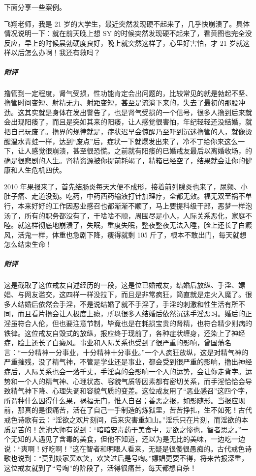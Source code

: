 下面分享一些案例。

\begin{case}
    飞翔老师，我是 21 岁的大学生，最近突然发现硬不起来了，几乎快崩溃了。具体情况说明一下：就在前天晚上想 SY 的时候突然发现硬不起来了，看黄图也完全没反应，早上的时候晨勃硬度良好，晚上就突然这样了，心里好害怕，才 21 岁就这样以后怎么办啊！我还有救吗？
    \subparagraph{附评} 撸管到一定程度，肾气受损，性功能肯定会出问题的，比较常见的就是勃起不坚、撸管时间变短、射精无力、射距变短，甚至是流淌下来的，失去了最初的那股冲劲。这其实就是身体在发出警告了，也是肾气受损的一个信号，很多人撸到后来就会出现阳痿了，而且是突如其来的阳痿，让人感觉很害怕，年纪轻轻还没结婚，就把自己玩废了。撸界的规律就是，症状迟早会惊醒乃至吓到沉迷撸管的人，就像烫醒温水青蛙一样，达到“废点”后，症状一下就爆发出来了，冷不丁给你来这么一下，让人感觉很崩溃，甚至很恐慌。之前就有阳痿的已婚戒友最后以离婚收场，的确是很悲剧的人生。肾精资源被你提前耗竭了，精箱已经空了，结果就会让你的健康和人生危机四伏。
\end{case}

\begin{case}
    2010 年果报来了，首先结肠炎每天大便不成形，接着前列腺炎也来了，尿频、小肚子痛、走道没劲。吃药，中药西药输液打针加理疗，全都无效。福无双至祸不单行，本来好好的工作因恶业感召也都渐渐不顺了，马上要提科级干部，恶梦一样泡汤了，所有的职务都没有了，干啥啥不顺，周围尽是小人，人际关系恶化，家庭不睦。就这样彻底地崩溃了，失眠，重度失眠，整夜整夜无法入睡，脸上还长了白癜风，活鬼一样，体重也急剧下降，瘦得就剩 105 斤了，根本不敢出门，每天就想怎么结束生命！
    \subparagraph{附评} 这是截取了这位戒友自述经历的一段，这是位已婚戒友，结婚后放纵、手淫、嫖娼、与网友滥交，这四样一样没拉下，而且是非常疯狂，简直就是走火入魔了。很多人结婚后依然会手淫，不是说结婚了就不手淫了，手淫的刺激和性生活有所不同，而且看片撸会让人极度上瘾，所以很多人结婚后依然沉迷手淫恶习。婚后的正淫虽符合人伦，但也要注意节制，毕竟也是在耗损宝贵的肾精，也符合精少则病的铁律。这位戒友自毁式的放纵，报应终于现前了，各种症状缠身，还染上了神经症，脸上还长了白癜风。事业和人际关系也受到了很严重的影响，曾国藩名言：“一分精神一分事业，十分精神十分事业。”一个人疯狂放纵，这是对精气神的严重摧残，没了精气神，不管是学业还是事业，都会受到很严重的影响，撸出神经症后，人际关系也会一落千丈，手淫真的会影响一个人的运势，会让你走背字。运势和一个人的精气神、心理状态、容貌气质等因素都有密切关系，而手淫恰恰会导致精气神下降、心理失调和容貌气质的变差。这位戒友用了“恶业感召”这四个字，所谓种什么因得什么果，祸福无门，惟人自召；善恶之报，如影随形。当报应现前，那真的是很痛苦，活在了自己一手制造的炼狱里，苦苦挣扎，生不如死！古代戒色诗歌有云：“淫欲之欢片刻间，后来灾害重如山。”淫乐只在片刻，而淫欲的本质是苦的！莲池大师有说到：“暗暗安毒药于美食中，是欲之惨也，智者思之。”一个无知的人遇见了含毒的美食，但他不知道，还以为是无比的美味，一边吃一边说：“爽啊！好吃啊！”这在智者和明眼人看来，无疑是很傻很愚痴的。古代戒色诗歌也说到：“莫到妓家买欢笑，欢笑过后是号啕。”嫖娼更要不得，将来苦报深重，这位戒友就到了“号啕”的阶段了，活得很痛苦，每天都想自杀！
\end{case}

